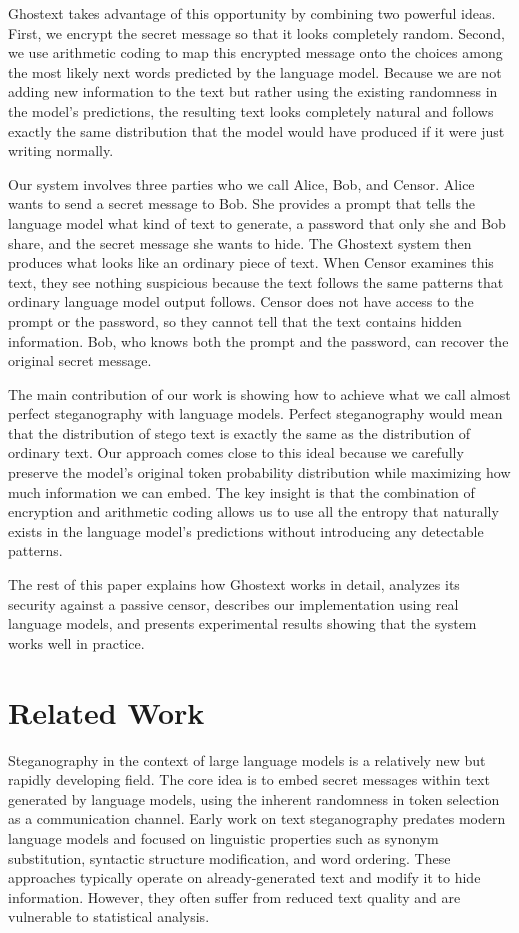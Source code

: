\documentclass[sigconf,review,anonymous]{acmart}
\begin{document}
Ghostext takes advantage of this opportunity by combining two powerful ideas. First, we encrypt the secret message so that it looks completely random. Second, we use arithmetic coding to map this encrypted message onto the choices among the most likely next words predicted by the language model. Because we are not adding new information to the text but rather using the existing randomness in the model's predictions, the resulting text looks completely natural and follows exactly the same distribution that the model would have produced if it were just writing normally.

Our system involves three parties who we call Alice, Bob, and Censor. Alice wants to send a secret message to Bob. She provides a prompt that tells the language model what kind of text to generate, a password that only she and Bob share, and the secret message she wants to hide. The Ghostext system then produces what looks like an ordinary piece of text. When Censor examines this text, they see nothing suspicious because the text follows the same patterns that ordinary language model output follows. Censor does not have access to the prompt or the password, so they cannot tell that the text contains hidden information. Bob, who knows both the prompt and the password, can recover the original secret message.

The main contribution of our work is showing how to achieve what we call almost perfect steganography with language models. Perfect steganography would mean that the distribution of stego text is exactly the same as the distribution of ordinary text. Our approach comes close to this ideal because we carefully preserve the model's original token probability distribution while maximizing how much information we can embed. The key insight is that the combination of encryption and arithmetic coding allows us to use all the entropy that naturally exists in the language model's predictions without introducing any detectable patterns.

The rest of this paper explains how Ghostext works in detail, analyzes its security against a passive censor, describes our implementation using real language models, and presents experimental results showing that the system works well in practice.

\section{Related Work}

Steganography in the context of large language models is a relatively new but rapidly developing field. The core idea is to embed secret messages within text generated by language models, using the inherent randomness in token selection as a communication channel. Early work on text steganography predates modern language models and focused on linguistic properties such as synonym substitution, syntactic structure modification, and word ordering. These approaches typically operate on already-generated text and modify it to hide information. However, they often suffer from reduced text quality and are vulnerable to statistical analysis.
\end{document}
